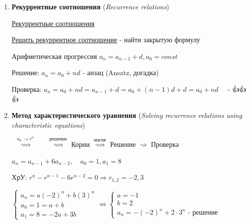 \documentclass[12pt]{article}
\begin{document}
    \begin{enumerate}
        \item \textbf{Рекуррентные соотношения} (\textit{Recurrence relations})
        
        \hyperlink{recurrencerelations}{Рекуррентные соотношения}

        \underline{Решить рекуррентное соотношение} - найти закрытую формулу

        \Exs Арифметическая прогрессия $a_n = a_{n - 1} + d, a_0 = const$

        Решение: $a_n = a_0 + nd$ - анзац (Ansatz, догадка)

        Проверка: $a_n = a_0 + nd = a_{n - 1} + d = a_0 + (n - 1)d + d = a_0 + nd \quad$ - {\Large👍👍👍}

        \item \textbf{Метод характеристического уравнения} (\textit{Solving recurrence relations using characteristic equations})

         \ $\stackrel{a_n \to r^n}{\rightsquigarrow}$ \  \ $\stackrel{\text{решение}}{\rightsquigarrow}$ Корни $\stackrel{\text{магия}}{\rightsquigarrow}$ Решение $\rightsquigarrow$ Проверка

        \vspace{3mm}

        \Exs $a_n = a_{n - 1} + 6a_{n - 2}, \quad a_0 = 1, a_1 = 8$

        ХрУ: $r^n - r^{n - 1} - 6r^{n - 2} = 0 \Longrightarrow r_{1,2} = -2, 3$


        \vspace{3mm}

        $
        \begin{cases}a_n = a(-2)^n + b(3)^n \\ a_0 = 1 = a + b \\ a_1 = 8 = -2a + 3b\end{cases} \Longleftrightarrow
        \begin{cases}a = -1 \\ b = 2 \\ a_n = -(-2)^n + 2 \cdot 3^n \text{ - решение}\end{cases}
        $



\end{enumerate}
\end{document}

